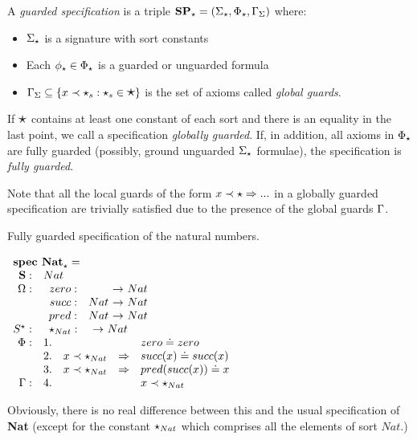 \begin{definition}\label{def:guardedspec}
A {\em guarded specification} is a triple ${\bf SP_\star} = (\Sigma_\star,\Phi_\star,\Gamma_{\Sigma})$ where:
\begin{itemize}\MyLPar
\item $\Sigma_\star$ is a signature with sort constants
\item Each $\phi_\star \in \Phi_\star$ is a guarded or unguarded formula
\item $\Gamma_\Sigma \subseteq \{ x \prec \star_s : \star_s \in \mbox{\Large{$\star$}} \}$ is the
set of axioms called {\em global guards}.
\end{itemize}
If $\mbox{\Large{$\star$}}$ contains at least one constant of each sort and there is an equality in the last point, 
we call a specification {\em
	globally guarded}. If, in addition, all axioms in $\Phi_\star$ are
	fully guarded (possibly, ground unguarded $\Sigma_\star$ formulae), the specification is {\em fully guarded}.
\end{definition}
Note that all the local guards of the form $x\prec\star\Rightarrow...$ in a globally
guarded specification are trivially satisfied 
due to the presence of the global guards $\Gamma$.

\begin{example}\label{ex:Nat}
Fully guarded specification of the natural numbers.

\( 
	\spec{
	\tit{\mbox{\bf spec\ Nat}_\cons^{{}}=} \\
		\spSort{Nat}
		\spOp{ zero: && Nat\\
			succ: & Nat & Nat\\
			 pred: &Nat & Nat}
		\spOps{\allcons}{ \cons_{Nat}: && Nat }
		\Phi:
			&1.& && zero \eleq zero \\
			&2.& x \prec \cons_{Nat} & \To & succ(x) \eleq succ(x)\\
			&3.& x \prec \cons_{Nat} & \To & pred(succ(x)) \eleq x\\
		\Gamma:	&4.& && x \prec \cons_{Nat}\\
	}
\)
\end{example}
Obviously, there is no real difference between this and the usual
specification of {\bf Nat} (except for the constant $\star_{Nat}$ which
comprises all the elements of sort $Nat$.)

